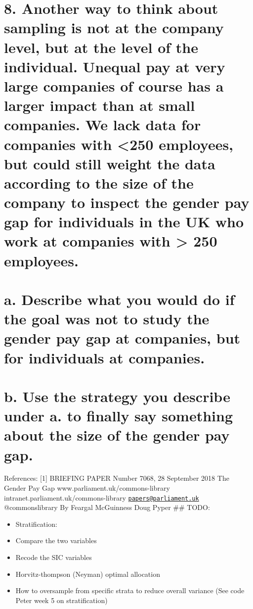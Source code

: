 \documentclass[]{article}
\providecommand{\tightlist}{%
  \setlength{\itemsep}{0pt}\setlength{\parskip}{0pt}}
\begin{document}
\section{8. Another way to think about sampling is not at the company
level, but at the level of the individual. Unequal pay at very large
companies of course has a larger impact than at small companies. We lack
data for companies with \textless{}250 employees, but could still weight
the data according to the size of the company to inspect the gender pay
gap for individuals in the UK who work at companies with \textgreater{}
250
employees.}\label{another-way-to-think-about-sampling-is-not-at-the-company-level-but-at-the-level-of-the-individual.-unequal-pay-at-very-large-companies-of-course-has-a-larger-impact-than-at-small-companies.-we-lack-data-for-companies-with-250-employees-but-could-still-weight-the-data-according-to-the-size-of-the-company-to-inspect-the-gender-pay-gap-for-individuals-in-the-uk-who-work-at-companies-with-250-employees.}

\section{a. Describe what you would do if the goal was not to study the
gender pay gap at companies, but for individuals at
companies.}\label{a.-describe-what-you-would-do-if-the-goal-was-not-to-study-the-gender-pay-gap-at-companies-but-for-individuals-at-companies.}

\section{b. Use the strategy you describe under a. to finally say
something about the size of the gender pay
gap.}\label{b.-use-the-strategy-you-describe-under-a.-to-finally-say-something-about-the-size-of-the-gender-pay-gap.}

References: {[}1{]} BRIEFING PAPER Number 7068, 28 September 2018 The
Gender Pay Gap www.parliament.uk/commons-library \textbar{}
intranet.parliament.uk/commons-library \textbar{}
\href{mailto:papers@parliament.uk}{\nolinkurl{papers@parliament.uk}}
\textbar{} @commonslibrary By Feargal McGuinness Doug Pyper \#\# TODO:

\begin{itemize}
\tightlist
\item
  Stratification:
\item
  Compare the two variables
\item
  Recode the SIC variables
\item
  Horvitz-thompson (Neyman) optimal allocation
\item
  How to oversample from specific strata to reduce overall variance (See
  code Peter week 5 on stratification)
\end{itemize}
\end{document}
